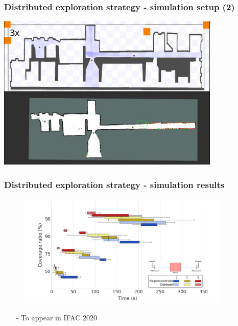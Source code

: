 \begin{frame}
	\frametitle{Distributed exploration strategy - simulation setup (2)}
		\centering
		\href{presentation_video.mp4}{\includegraphics[width=0.8\textwidth]{figures/title_screen.png}}
\end{frame}

\begin{frame}
	\frametitle{Distributed exploration strategy - simulation results}
	\begin{figure}
		\centering
		\includegraphics[width=0.9\textwidth]{figures/results_final}
	\end{figure}
	\begin{itemize}
		\item[-] To appear in IFAC 2020
	\end{itemize}
	
\end{frame}


